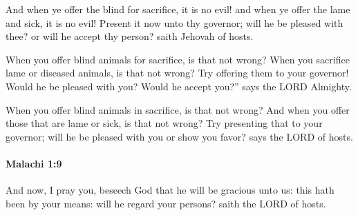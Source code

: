			\begin{versebox}
					\item[BHS] 
					\item[LXX] 
					\item[ASV] And when ye offer the blind for sacrifice, it is no evil! and when ye offer the lame and sick, it is no evil! Present it now unto thy governor; will he be pleased with thee? or will he accept thy person? saith Jehovah of hosts.
					\item[NIV] When you offer blind animals for sacrifice, is that not wrong? When you sacrifice lame or diseased animals, is that not wrong? Try offering them to your governor! Would he be pleased with you? Would he accept you?” says the LORD Almighty.
					\item[NRSV] When you offer blind animals in sacrifice, is that not wrong? And when you offer those that are lame or sick, is that not wrong? Try presenting that to your governor; will he be pleased with you or show you favor? says the LORD of hosts.
			\end{versebox}

		\paragraph{Malachi 1:9} %
			\label{MALACHI-1-9}

			And now, I pray you, beseech God that he will be gracious unto us: this hath been by your means: will he regard your persons? saith the LORD of hosts.

